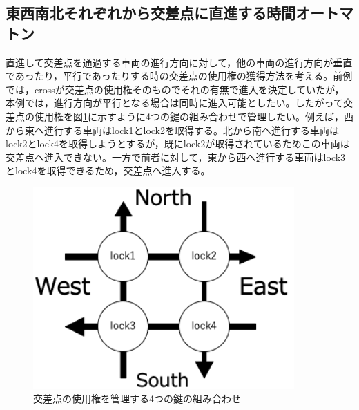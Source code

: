 \documentclass{tpu-sotu}
\begin{document}
	\subsection{東西南北それぞれから交差点に直進する時間オートマトン}
	直進して交差点を通過する車両の進行方向に対して，他の車両の進行方向が垂直であったり，平行であったりする時の交差点の使用権の獲得方法を考える。前例では，crossが交差点の使用権そのものでそれの有無で進入を決定していたが，本例では，進行方向が平行となる場合は同時に進入可能としたい。したがって交差点の使用権を図\ref{oTWoL}に示すように4つの鍵の組み合わせで管理したい。例えば，西から東へ進行する車両はlock1とlock2を取得する。北から南へ進行する車両はlock2とlock4を取得しようとするが，既にlock2が取得されているためこの車両は交差点へ進入できない。一方で前者に対して，東から西へ進行する車両はlock3とlock4を取得できるため，交差点へ進入する。
	\begin{figure}[htbp]
	\centering
	\includegraphics[width=100mm]{onTheWayofLock.png}
	\caption{交差点の使用権を管理する4つの鍵の組み合わせ}
	\label{oTWoL}
	\end{figure}
\end{document}
